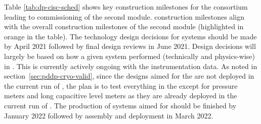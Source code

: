 Table \ref{tab:dp-cisc-sched} shows key construction milestones for the  consortium leading to commissioning of the second  module.  construction milestones align with the overall construction milestones of the second  module (highlighted in orange in the table). The technology design decisions for  systems should be made by April 2021 followed by final design reviews in June 2021. Design decisions will largely be based on how a given system performed (technically and physics-wise) in . This is currently actively ongoing with the  instrumentation data.  
As noted in section~\ref{sec:pddp-cryo-valid}, since the designs aimed for the \dual {} are not deployed in the current run of , the plan is to test everything in the   except for pressure meters and long capacitive level meters as they are already deployed in the current run of . The production of systems aimed for  \dual should be finished by January 2022 followed by assembly and deployment in March 2022. 


